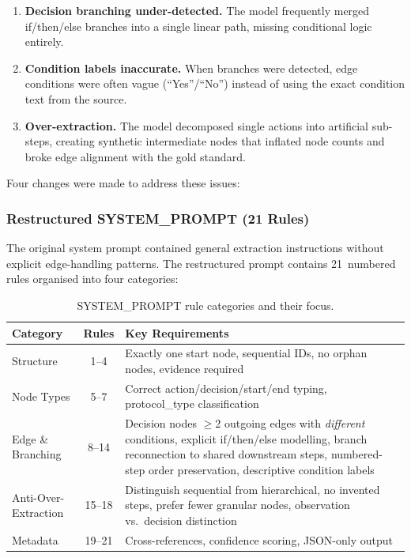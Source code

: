 \documentclass[12pt,a4paper]{article}
\begin{document}
\begin{enumerate}[leftmargin=2em]
    \item \textbf{Decision branching under-detected.} The model frequently merged if/then/else branches into a single linear path, missing conditional logic entirely.
    \item \textbf{Condition labels inaccurate.} When branches were detected, edge conditions were often vague (``Yes''/``No'') instead of using the exact condition text from the source.
    \item \textbf{Over-extraction.} The model decomposed single actions into artificial sub-steps, creating synthetic intermediate nodes that inflated node counts and broke edge alignment with the gold standard.
\end{enumerate}

Four changes were made to address these issues:

\subsubsection{Restructured SYSTEM\_PROMPT (21 Rules)}

The original system prompt contained general extraction instructions without explicit edge-handling patterns. The restructured prompt contains 21~numbered rules organised into four categories:

\begin{table}[H]
\centering
\caption{SYSTEM\_PROMPT rule categories and their focus.}
\label{tab:prompt-rules}
\begin{tabularx}{\textwidth}{l c X}
\toprule
\textbf{Category} & \textbf{Rules} & \textbf{Key Requirements} \\
\midrule
Structure          & 1--4   & Exactly one start node, sequential IDs, no orphan nodes, evidence required \\
Node Types         & 5--7   & Correct action/decision/start/end typing, protocol\_type classification \\
Edge \& Branching  & 8--14  & Decision nodes $\geq$2 outgoing edges with \emph{different} conditions, explicit if/then/else modelling, branch reconnection to shared downstream steps, numbered-step order preservation, descriptive condition labels \\
Anti-Over-Extraction & 15--18 & Distinguish sequential from hierarchical, no invented steps, prefer fewer granular nodes, observation vs.\ decision distinction \\
Metadata           & 19--21 & Cross-references, confidence scoring, JSON-only output \\
\bottomrule
\end{tabularx}
\end{table}
\end{document}
